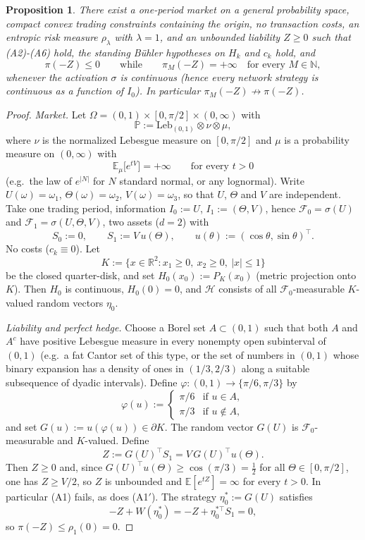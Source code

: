 \documentclass[11pt,a4paper]{report}
\numberwithin{equation}{chapter}
\theoremstyle{plain}
\newtheorem{proposition}{Proposition}[chapter]
\theoremstyle{definition}
\newcommand{\E}{\mathbb{E}}
\newcommand{\PP}{\mathbb{P}}
\newcommand{\R}{\mathbb{R}}
\newcommand{\N}{\mathbb{N}}
\newcommand{\F}{\mathcal{F}}
\newcommand{\HH}{\mathcal{H}}
\begin{document}
\begin{proposition}\label{prop:sharp-A1}
    There exist a one-period market on a general probability space, compact convex trading constraints containing the origin, no transaction costs, an entropic risk measure $\rho_\lambda$ with $\lambda=1$, and an unbounded liability $Z\ge0$ such that \textup{(A2)}-\textup{(A6)} hold, the standing B\"uhler hypotheses on $H_k$ and $c_k$ hold, and
    \[
        \pi(-Z)\le0\qquad\text{while}\qquad\pi_M(-Z)=+\infty\quad\text{for every }M\in\N,
    \]
    whenever the activation $\sigma$ is continuous (hence every network strategy is continuous as a function of $I_0$). In particular $\pi_M(-Z)\not\to\pi(-Z)$.
\end{proposition}

\begin{proof}
    \emph{Market.} Let $\Omega=(0,1)\times[0,\pi/2]\times(0,\infty)$ with
    \[
        \PP:=\mathrm{Leb}_{(0,1)}\otimes\nu\otimes\mu,
    \]
    where $\nu$ is the normalized Lebesgue measure on $[0,\pi/2]$ and $\mu$ is a probability measure on $(0,\infty)$ with
    \[
        \E_\mu\bigl[e^{tV}\bigr]=+\infty\qquad\text{for every }t>0
    \]
    (e.g.\ the law of $e^{|N|}$ for $N$ standard normal, or any lognormal). Write $U(\omega)=\omega_1$, $\Theta(\omega)=\omega_2$, $V(\omega)=\omega_3$, so that $U$, $\Theta$ and $V$ are independent. Take one trading period, information $I_0:=U$, $I_1:=(\Theta,V)$, hence $\F_0=\sigma(U)$ and $\F_1=\sigma(U,\Theta,V)$, two assets ($d=2$) with
    \[
        S_0:=0,\qquad S_1:=V\,u(\Theta),\qquad u(\theta):=(\cos\theta,\sin\theta)^\top.
    \]
    No costs ($c_k\equiv0$). Let
    \[
        K:=\bigl\{x\in\R^2:x_1\ge0,\ x_2\ge0,\ |x|\le1\bigr\}
    \]
    be the closed quarter-disk, and set $H_0(x_0):=P_K(x_0)$ (metric projection onto $K$). Then $H_0$ is continuous, $H_0(0)=0$, and $\HH$ consists of all $\F_0$-measurable $K$-valued random vectors $\eta_0$.

    \emph{Liability and perfect hedge.} Choose a Borel set $A\subset(0,1)$ such that both $A$ and $A^c$ have positive Lebesgue measure in every nonempty open subinterval of $(0,1)$ (e.g.\ a fat Cantor set of this type, or the set of numbers in $(0,1)$ whose binary expansion has a density of ones in $(1/3,2/3)$ along a suitable subsequence of dyadic intervals). Define $\varphi:(0,1)\to\{\pi/6,\pi/3\}$ by
    \[
        \varphi(u):=\begin{cases}
            \pi/6 & \text{if }u\in A,    \\
            \pi/3 & \text{if }u\notin A,
        \end{cases}
    \]
    and set $G(u):=u(\varphi(u))\in\partial K$. The random vector $G(U)$ is $\F_0$-measurable and $K$-valued. Define
    \[
        Z:=G(U)^\top S_1=V\,G(U)^\top u(\Theta).
    \]
    Then $Z\ge0$ and, since $G(U)^\top u(\Theta)\ge\cos(\pi/3)=\tfrac12$ for all $\Theta\in[0,\pi/2]$, one has $Z\ge V/2$, so $Z$ is unbounded and $\E[e^{tZ}]=\infty$ for every $t>0$. In particular (A1) fails, as does (A1$'$). The strategy $\eta_0^*:=G(U)$ satisfies
    \[
        -Z+W(\eta_0^*)=-Z+\eta_0^{*\top}S_1=0,
    \]
    so $\pi(-Z)\le\rho_1(0)=0$.


\end{proof}
\end{document}
